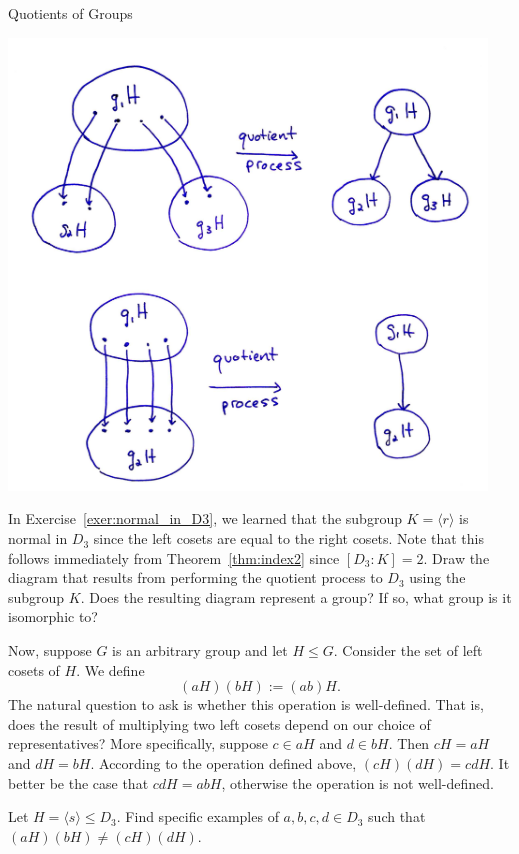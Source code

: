 \begin{section}{Quotients of Groups}
\begin{center}
\includegraphics[width=5in]{QuotientProcess.png}
\end{center}

\begin{exercise}
In Exercise~\ref{exer:normal_in_D3}, we learned that the subgroup $K=\langle r\rangle$ is normal in $D_3$ since the left cosets are equal to the right cosets.  Note that this follows immediately from Theorem~\ref{thm:index2} since $[D_3:K]=2$.  Draw the diagram that results from performing the quotient process to $D_3$ using the subgroup $K$.  Does the resulting diagram represent a group?  If so, what group is it isomorphic to?
\end{exercise}

Now, suppose $G$ is an arbitrary group and let $H\leq G$. Consider the set of left cosets of $H$.  We define
\[
(aH)(bH):=(ab)H.
\]
The natural question to ask is whether this operation is well-defined.  That is, does the result of multiplying two left cosets depend on our choice of representatives?  More specifically, suppose $c\in aH$ and $d\in bH$.  Then $cH=aH$ and $dH=bH$.  According to the operation defined above, $(cH)(dH)=cdH$.  It better be the case that $cdH=abH$, otherwise the operation is not well-defined.

\begin{exercise}
Let $H=\langle s\rangle \leq D_3$.  Find specific examples of $a,b,c,d\in D_3$ such that $(aH)(bH)\neq (cH)(dH)$.
\end{exercise}


\end{section}
